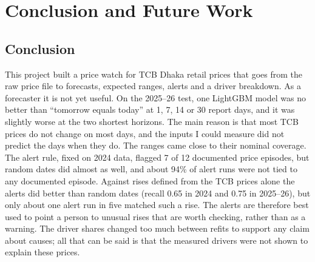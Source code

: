 \chapter{Conclusion and Future Work}

\section{Conclusion}
This project built a price watch for TCB Dhaka retail prices that goes from the raw price file to forecasts, expected ranges, alerts and a driver breakdown. As a forecaster it is not yet useful. On the 2025--26 test, one LightGBM model was no better than ``tomorrow equals today'' at 1, 7, 14 or 30 report days, and it was slightly worse at the two shortest horizons. The main reason is that most TCB prices do not change on most days, and the inputs I could measure did not predict the days when they do. The ranges came close to their nominal coverage. The alert rule, fixed on 2024 data, flagged 7 of 12 documented price episodes, but random dates did almost as well, and about 94\% of alert runs were not tied to any documented episode. Against rises defined from the TCB prices alone the alerts did better than random dates (recall 0.65 in 2024 and 0.75 in 2025--26), but only about one alert run in five matched such a rise. The alerts are therefore best used to point a person to unusual rises that are worth checking, rather than as a warning. The driver shares changed too much between refits to support any claim about causes; all that can be said is that the measured drivers were not shown to explain these prices.

